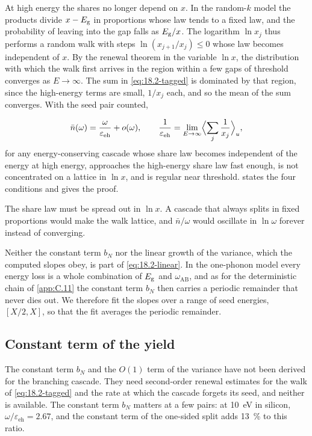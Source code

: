 At high energy the shares no longer depend on $x$. In the random-$k$ model the products divide $x - E_{\mathrm{g}}$ in proportions whose law tends to a fixed law, and the probability of leaving into the gap falls as $E_{\mathrm{g}}/x$. The logarithm $\ln x_j$ thus performs a random walk with steps $\ln(x_{j+1}/x_j) \le 0$ whose law becomes independent of $x$. By the renewal theorem in the variable $\ln x$, the distribution with which the walk first arrives in the region within a few gaps of threshold converges as $E \to \infty$. The sum in \cref{eq:18.2-tagged} is dominated by that region, since the high-energy terms are small, $1/x_j$ each, and so the mean of the sum converges. With the seed pair counted,
\begin{keyresult}
\begin{equation}
  \bar n(\omega) = \frac{\omega}{\varepsilon_{\mathrm{eh}}} + o(\omega) , \qquad
  \frac{1}{\varepsilon_{\mathrm{eh}}} = \lim_{E\to\infty}\Bigl\langle\sum_j\frac{1}{x_j}\Bigr\rangle_u ,
  \label{eq:18.2-linear}
\end{equation}
for any energy-conserving cascade whose share law becomes independent of the energy at high energy, approaches the high-energy share law fast enough, is not concentrated on a lattice in $\ln x$, and is regular near threshold.  states the four conditions and gives the proof.
\end{keyresult}
\noindent The share law must be spread out in $\ln x$. A cascade that always splits in fixed proportions would make the walk lattice, and $\bar n/\omega$ would oscillate in $\ln\omega$ forever instead of converging.

Neither the constant term $b_N$ nor the linear growth of the variance, which the computed slopes obey, is part of \cref{eq:18.2-linear}. In the one-phonon model every energy loss is a whole combination of $E_{\mathrm{g}}$ and $\omega_{\mathrm{AB}}$, and as for the deterministic chain of \cref{app:C.11} the constant term $b_N$ then carries a periodic remainder that never dies out. We therefore fit the slopes over a range of seed energies, $[X/2, X]$, so that the fit averages the periodic remainder.

\subsection{Constant term of the yield}\label{sec:18.2-open}

The constant term $b_N$ and the $O(1)$ term of the variance have not been derived for the branching cascade. They need second-order renewal estimates for the walk of \cref{eq:18.2-tagged} and the rate at which the cascade forgets its seed, and neither is available. The constant term $b_N$ matters at a few pairs: at \SI{10}{eV} in silicon, $\omega/\varepsilon_{\mathrm{eh}} = 2.67$, and the constant term of the one-sided split adds \SI{13}{\percent} to this ratio.
